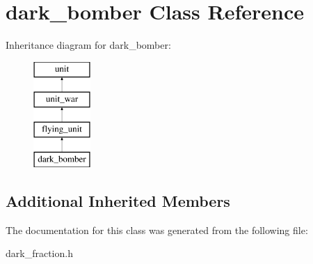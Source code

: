 \hypertarget{classdark__bomber}{}\section{dark\+\_\+bomber Class Reference}
\label{classdark__bomber}
Inheritance diagram for dark\+\_\+bomber\+:\begin{figure}[H]
\begin{center}
\leavevmode
\includegraphics[height=4.000000cm]{classdark__bomber}
\end{center}
\end{figure}
\subsection*{Additional Inherited Members}


The documentation for this class was generated from the following file\+:\begin{DoxyCompactItemize}
\item 
dark\+\_\+fraction.\+h\end{DoxyCompactItemize}
